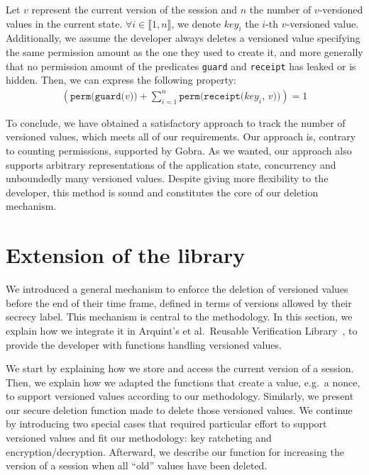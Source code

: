 \begin{lemma}\label{lem:sum-perm-eq-1}

    Let $v$ represent the current version of the session and $n$ the number of $v$-versioned values in the current state. $\forall i \in \llbracket 1, n \rrbracket$, we denote $key_i$ the $i$-th $v$-versioned value.
    Additionally, we assume the developer always deletes a versioned value specifying the same permission amount as the one they used to create it, and more generally that no permission amount of the predicates \texttt{guard} and \texttt{receipt} has leaked or is hidden.
    Then, we can express the following property:
    \begin{align*}
        \left(\texttt{perm(guard($v$))} + \sum_{i=1}^n \texttt{perm(receipt($key_i$, $v$))}\right) = 1
    \end{align*}

\end{lemma}

To conclude, we have obtained a satisfactory approach to track the number of versioned values, which meets all of our requirements.
Our approach is, contrary to counting permissions, supported by Gobra.
As we wanted, our approach also supports arbitrary representations of the application state, concurrency and unboundedly many versioned values.
Despite giving more flexibility to the developer, this method is sound and constitutes the core of our deletion mechanism.

\section{Extension of the library}
\label{sec:extension-of-the-library}

We introduced a general mechanism to enforce the deletion of versioned values before the end of their time frame, defined in terms of versions allowed by their secrecy label.
This mechanism is central to the methodology.
In this section, we explain how we integrate it in Arquint's et al.\ Reusable Verification Library~\cite{ArquintSchwerhoffMehtaMueller23}, to provide the developer with functions handling versioned values.

We start by explaining how we store and access the current version of a session.
Then, we explain how we adapted the functions that create a value, e.g.\  a nonce, to support versioned values according to our methodology.
Similarly, we present our secure deletion function made to delete those versioned values.
We continue by introducing two special cases that required particular effort to support versioned values and fit our methodology: key ratcheting and encryption/decryption. 
Afterward, we describe our function for increasing the version of a session when all “old” values have been deleted.

